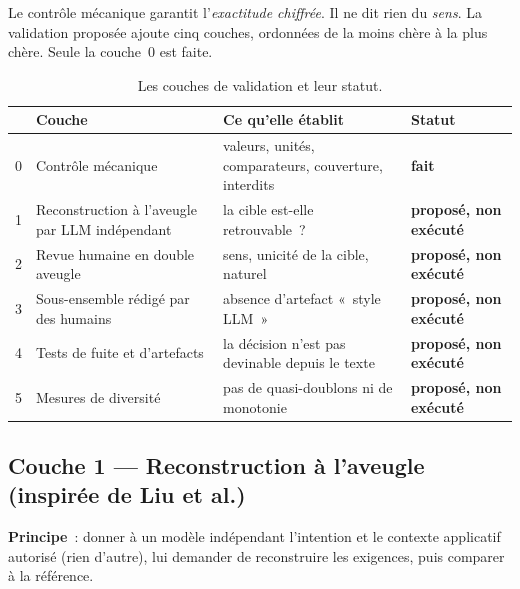 \documentclass[11pt,a4paper]{article}
\newcommand{\fait}{\textcolor{ok}{\textbf{fait}}}
\newcommand{\propose}{\textcolor{todo}{\textbf{proposé, non exécuté}}}
\begin{document}
Le contrôle mécanique garantit l'\emph{exactitude chiffrée}. Il ne dit rien du \emph{sens}. La validation proposée ajoute cinq couches, ordonnées de la moins chère à la plus chère. Seule la couche~0 est faite.

\begin{table}[h]
\centering
\caption{Les couches de validation et leur statut.}
\small
\begin{tabularx}{\linewidth}{@{}clXl@{}}
\toprule
& Couche & Ce qu'elle établit & Statut \\
\midrule
0 & Contrôle mécanique & valeurs, unités, comparateurs, couverture, interdits & \fait \\
1 & Reconstruction à l'aveugle par LLM indépendant & la cible est-elle retrouvable~? & \propose \\
2 & Revue humaine en double aveugle & sens, unicité de la cible, naturel & \propose \\
3 & Sous-ensemble rédigé par des humains & absence d'artefact «~style LLM~» & \propose \\
4 & Tests de fuite et d'artefacts & la décision n'est pas devinable depuis le texte & \propose \\
5 & Mesures de diversité & pas de quasi-doublons ni de monotonie & \propose \\
\bottomrule
\end{tabularx}
\end{table}

\subsection{Couche 1 --- Reconstruction à l'aveugle (inspirée de Liu et al.)}

\textbf{Principe}~: donner à un modèle indépendant l'intention et le contexte applicatif autorisé (rien d'autre), lui demander de reconstruire les exigences, puis comparer à la référence.
\end{document}
